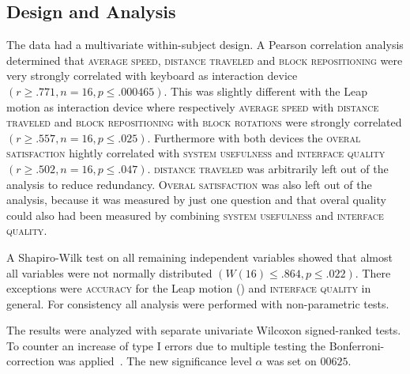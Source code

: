 \subsection{Design and Analysis}
The data had a multivariate within-subject design. A Pearson correlation analysis determined that \textsc{average speed}, \textsc{distance traveled} and \textsc{block repositioning} were very strongly correlated with keyboard as interaction device $(r \geq .771, n = 16, p \leq .000465)$. This was slightly different with the Leap motion as interaction device where respectively \textsc{average speed} with \textsc{distance traveled} and \textsc{block repositioning} with \textsc{block rotations} were strongly correlated $(r  \geq .557, n = 16, p \leq .025)$. Furthermore with both devices the \textsc{overal satisfaction} hightly correlated with \textsc{system usefulness} and \textsc{interface quality}$(r  \geq .502, n = 16, p \leq .047)$. \textsc{distance traveled} was arbitrarily left out of the analysis to reduce redundancy.  \textsc{Overal satisfaction} was also left out of the analysis, because it was measured by just one question and that overal quality could also had been measured by combining \textsc{system usefulness} and \textsc{interface quality}. 

A Shapiro-Wilk test on all remaining independent variables showed that almost all variables were not normally distributed $(W(16) \leq .864, p \leq .022 )$. There exceptions were \textsc{accuracy} for the Leap motion () and \textsc{interface quality} in general. For consistency all analysis were performed with non-parametric tests.

The results were analyzed with separate univariate Wilcoxon signed-ranked tests. To counter an increase of type I errors due to multiple testing the Bonferroni-correction was applied~\cite{dunn61}. The new significance level $\alpha$ was set on $00625$.
